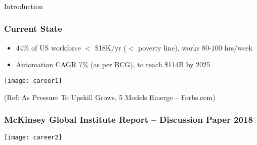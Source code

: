 \begin{frame}[fragile]\frametitle{}
\begin{center}
{\Large Introduction}
\end{center}
\end{frame}


\begin{frame}[fragile]\frametitle{Current State}
\begin{itemize}
\item 44\% of US workforce $<$ \$18K/yr ($<$ poverty line), works 80-100 hrs/week
\item Automation CAGR 7\% (as per BCG), to reach \$114B by 2025
\end{itemize}

\begin{center}
\texttt{[image: career1]}
\end{center}

{\tiny (Ref: As Pressure To Upskill Grows, 5 Models Emerge – Forbs.com)}
\end{frame}


\begin{frame}[fragile]\frametitle{McKinsey Global Institute Report – Discussion Paper 2018}



\begin{center}
\texttt{[image: career2]}
\end{center}

\end{frame}



